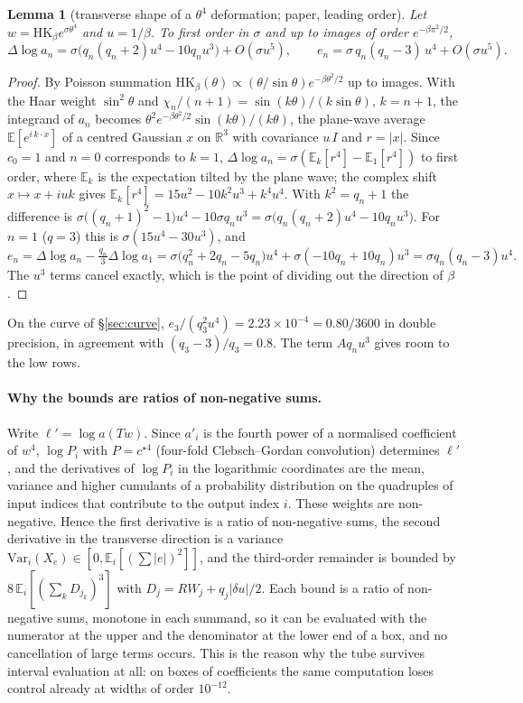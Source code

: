 \documentclass[11pt,a4paper]{article}
\newtheorem{lemma}[theorem]{Lemma}
\theoremstyle{definition}
\theoremstyle{remark}
\newcommand{\R}{\mathbb{R}}
\newcommand{\HK}{\mathrm{HK}}
\begin{document}
\begin{lemma}[transverse shape of a $\theta^4$ deformation; paper, leading order]\label{lem:shape}
Let $w=\HK_\beta e^{\sigma\theta^4}$ and $u=1/\beta$. To first order in $\sigma$ and up to images of order $e^{-\beta\pi^2/2}$,
\[
\Delta\log a_n=\sigma\bigl(q_n(q_n+2)u^4-10q_nu^3\bigr)+O(\sigma u^5),\qquad e_n=\sigma\,q_n(q_n-3)\,u^4+O(\sigma u^5).
\]
\end{lemma}
\begin{proof}
By Poisson summation $\HK_\beta(\theta)\propto(\theta/\sin\theta)e^{-\beta\theta^2/2}$ up to images.
With the Haar weight $\sin^2\theta$ and $\chi_n/(n+1)=\sin(k\theta)/(k\sin\theta)$, $k=n+1$, the integrand of $a_n$ becomes $\theta^2e^{-\beta\theta^2/2}\sin(k\theta)/(k\theta)$, the plane-wave average $\mathbb{E}[e^{i\,k\cdot x}]$ of a centred Gaussian $x$ on $\R^3$ with covariance $u\,I$ and $r=|x|$.
Since $c_0=1$ and $n=0$ corresponds to $k=1$, $\Delta\log a_n=\sigma(\mathbb{E}_k[r^4]-\mathbb{E}_1[r^4])$ to first order, where $\mathbb{E}_k$ is the expectation tilted by the plane wave; the complex shift $x\mapsto x+iuk$ gives $\mathbb{E}_k[r^4]=15u^2-10k^2u^3+k^4u^4$.
With $k^2=q_n+1$ the difference is $\sigma\bigl((q_n+1)^2-1\bigr)u^4-10\sigma q_nu^3=\sigma\bigl(q_n(q_n+2)u^4-10q_nu^3\bigr)$.
For $n=1$ ($q=3$) this is $\sigma(15u^4-30u^3)$, and
\[
e_n=\Delta\log a_n-\tfrac{q_n}3\Delta\log a_1=\sigma\bigl(q_n^2+2q_n-5q_n\bigr)u^4+\sigma(-10q_n+10q_n)u^3=\sigma q_n(q_n-3)u^4 .
\]
The $u^3$ terms cancel exactly, which is the point of dividing out the direction of $\beta$.
\end{proof}
On the curve of \S\ref{sec:curve}, $e_3/(q_3^2u^4)=2.23\times10^{-4}=0.80/3600$ in double precision, in agreement with $(q_3-3)/q_3=0.8$.
The term $Aq_nu^3$ gives room to the low rows.

\paragraph{Why the bounds are ratios of non-negative sums.}
Write $\ell'=\log a(Tw)$.
Since $a'_i$ is the fourth power of a normalised coefficient of $w^4$, $\log P_i$ with $P=c^{\star4}$ (four-fold Clebsch--Gordan convolution) determines $\ell'$, and the derivatives of $\log P_i$ in the logarithmic coordinates are the mean, variance and higher cumulants of a probability distribution on the quadruples of input indices that contribute to the output index $i$.
These weights are non-negative.
Hence the first derivative is a ratio of non-negative sums, the second derivative in the transverse direction is a variance $\mathrm{Var}_i(X_e)\in[0,\mathbb{E}_i[(\sum|e|)^2]]$, and the third-order remainder is bounded by $8\,\mathbb{E}_i[(\sum_k D_{j_k})^3]$ with $D_j=RW_j+q_j|\delta u|/2$.
Each bound is a ratio of non-negative sums, monotone in each summand, so it can be evaluated with the numerator at the upper and the denominator at the lower end of a box, and no cancellation of large terms occurs.
This is the reason why the tube survives interval evaluation at all: on boxes of coefficients the same computation loses control already at widths of order $10^{-12}$.
\end{document}
